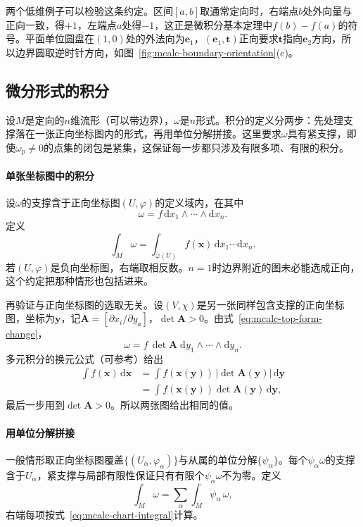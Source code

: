 两个低维例子可以检验这条约定。区间$[a,b]$取通常定向时，右端点$b$处外向量与正向一致，得$+1$，左端点$a$处得$-1$，这正是微积分基本定理中$f(b)-f(a)$的符号。平面单位圆盘在$(1,0)$处的外法向为$\bm e_1$，$(\bm e_1,\bm t)$正向要求$\bm t$指向$\bm e_2$方向，所以边界圆取逆时针方向，如图~\ref{fig:mcalc-boundary-orientation}(c)。

\subsection{微分形式的积分}
\label{sec:mcalc-integration-forms}

设$M$是定向的$n$维流形（可以带边界），$\omega$是$n$形式。积分的定义分两步：先处理支撑落在一张正向坐标图内的形式，再用单位分解拼接。这里要求$\omega$具有紧支撑，即使$\omega_p\neq0$的点集的闭包是紧集，这保证每一步都只涉及有限多项、有限的积分。

\paragraph{单张坐标图中的积分}
设$\omega$的支撑含于正向坐标图$(U,\varphi)$的定义域内，在其中
\[
\omega=f\,\mathrm dx_1\wedge\cdots\wedge\mathrm dx_n .
\]
定义
\begin{equation}
\int_M\omega=\int_{\varphi(U)}f(\bm x)\,\mathrm dx_1\cdots\mathrm dx_n .
\label{eq:mcalc-chart-integral}
\end{equation}
若$(U,\varphi)$是负向坐标图，右端取相反数。$n=1$时边界附近的图未必能选成正向，这个约定把那种情形也包括进来。

再验证与正向坐标图的选取无关。设$(V,\chi)$是另一张同样包含支撑的正向坐标图，坐标为$\bm y$，记$\bm A=[\partial x_i/\partial y_a]$，$\det\bm A>0$。由式~\eqref{eq:mcalc-top-form-change}，
\[
\omega=f\,\det\bm A\;\mathrm dy_1\wedge\cdots\wedge\mathrm dy_n .
\]
多元积分的换元公式（可参考）给出
\[
\begin{aligned}
\int f(\bm x)\,\mathrm d\bm x&=\int f(\bm x(\bm y))\,\lvert\det\bm A(\bm y)\rvert\,\mathrm d\bm y\\
&=\int f(\bm x(\bm y))\det\bm A(\bm y)\,\mathrm d\bm y ,
\end{aligned}
\]
最后一步用到$\det\bm A>0$。所以两张图给出相同的值。

\paragraph{用单位分解拼接}
一般情形取正向坐标图覆盖$\{(U_\alpha,\varphi_\alpha)\}$与从属的单位分解$\{\psi_\alpha\}$。每个$\psi_\alpha\omega$的支撑含于$U_\alpha$，紧支撑与局部有限性保证只有有限个$\psi_\alpha\omega$不为零。定义
\begin{equation}
\int_M\omega=\sum_\alpha\int_M\psi_\alpha\,\omega ,
\label{eq:mcalc-form-integral}
\end{equation}
右端每项按式~\eqref{eq:mcalc-chart-integral}计算。

